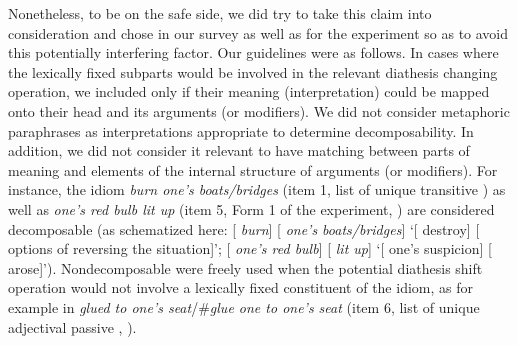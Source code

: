 \documentclass[output=paper]{langsci/langscibook}
\begin{document}
Nonetheless, to be on the safe side, we did try to take this claim into
consideration and chose  in our survey as well as  for the
experiment so as to avoid this potentially interfering factor. Our guidelines
were as follows. In cases where the lexically fixed subparts would be involved
in the relevant diathesis changing operation, we included  only if their
meaning (interpretation) could be mapped onto their head and its arguments (or
modifiers). We did not consider metaphoric paraphrases as interpretations
appropriate to determine decomposability. In addition, we did not consider it
relevant to have matching between parts of meaning and elements of the internal
structure of arguments (or modifiers). For instance, the idiom \emph{burn
one’s boats/bridges} (item 1, list of unique transitive ) as well as
\emph{one’s red bulb lit up} (item 5, Form 1 of the experiment, )
are considered decomposable (as schematized here: [ \emph{burn}]
[ \emph{one’s boats/bridges}] ‘[ destroy] [ options of
reversing the situation]’; [ \emph{one’s red bulb}] [ \emph{lit
up}] ‘[ one’s suspicion] [ arose]’). Nondecomposable  were
freely used when the potential diathesis shift operation would not involve a
lexically fixed constituent of the idiom, as for example in \emph{glued to
one’s seat}\slash \#\emph{glue one to one’s seat} (item 6, list of unique
adjectival passive , ).\largerpage[1]
\end{document}
